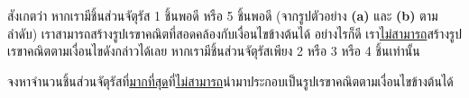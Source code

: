 สังเกตว่า หากเรามีชิ้นส่วนจัตุรัส 1 ชิ้นพอดี หรือ 5 ชิ้นพอดี
(จากรูปตัวอย่าง \textbf{(a)} และ \textbf{(b)} ตามลำดับ) 
เราสามารถสร้างรูปเรขาคณิตที่สอดคล้องกับเงื่อนไขข้างต้นได้\;
อย่างไรก็ดี เรา\uline{ไม่สามารถ}สร้างรูปเรขาคณิตตามเงื่อนไขดังกล่าวได้เลย 
หากเรามีชิ้นส่วนจัตุรัสเพียง 2 หรือ 3 หรือ 4 ชิ้นเท่านั้น

จงหาจำนวนชิ้นส่วนจัตุรัสที่\hrsp\uline{มากที่สุด}{\hrsp}ที่\hrsp\uline{ไม่สามารถ}{\hrsp}นำมาประกอบเป็นรูปเรขาคณิตตามเงื่อนไขข้างต้นได้
